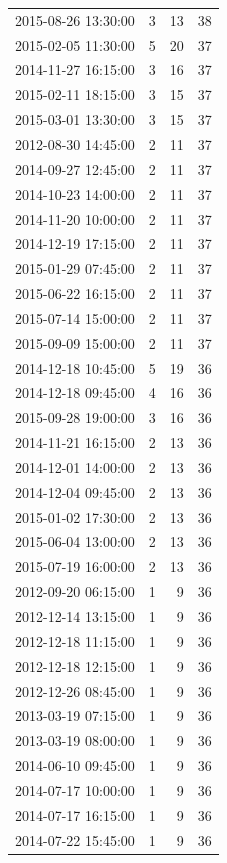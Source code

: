 \begin{tabular}{lrrr}
2015-08-26 13:30:00 & 3 & 13 & 38 \\
2015-02-05 11:30:00 & 5 & 20 & 37 \\
2014-11-27 16:15:00 & 3 & 16 & 37 \\
2015-02-11 18:15:00 & 3 & 15 & 37 \\
2015-03-01 13:30:00 & 3 & 15 & 37 \\
2012-08-30 14:45:00 & 2 & 11 & 37 \\
2014-09-27 12:45:00 & 2 & 11 & 37 \\
2014-10-23 14:00:00 & 2 & 11 & 37 \\
2014-11-20 10:00:00 & 2 & 11 & 37 \\
2014-12-19 17:15:00 & 2 & 11 & 37 \\
2015-01-29 07:45:00 & 2 & 11 & 37 \\
2015-06-22 16:15:00 & 2 & 11 & 37 \\
2015-07-14 15:00:00 & 2 & 11 & 37 \\
2015-09-09 15:00:00 & 2 & 11 & 37 \\
2014-12-18 10:45:00 & 5 & 19 & 36 \\
2014-12-18 09:45:00 & 4 & 16 & 36 \\
2015-09-28 19:00:00 & 3 & 16 & 36 \\
2014-11-21 16:15:00 & 2 & 13 & 36 \\
2014-12-01 14:00:00 & 2 & 13 & 36 \\
2014-12-04 09:45:00 & 2 & 13 & 36 \\
2015-01-02 17:30:00 & 2 & 13 & 36 \\
2015-06-04 13:00:00 & 2 & 13 & 36 \\
2015-07-19 16:00:00 & 2 & 13 & 36 \\
2012-09-20 06:15:00 & 1 & 9 & 36 \\
2012-12-14 13:15:00 & 1 & 9 & 36 \\
2012-12-18 11:15:00 & 1 & 9 & 36 \\
2012-12-18 12:15:00 & 1 & 9 & 36 \\
2012-12-26 08:45:00 & 1 & 9 & 36 \\
2013-03-19 07:15:00 & 1 & 9 & 36 \\
2013-03-19 08:00:00 & 1 & 9 & 36 \\
2014-06-10 09:45:00 & 1 & 9 & 36 \\
2014-07-17 10:00:00 & 1 & 9 & 36 \\
2014-07-17 16:15:00 & 1 & 9 & 36 \\
2014-07-22 15:45:00 & 1 & 9 & 36 \\

\end{tabular}
